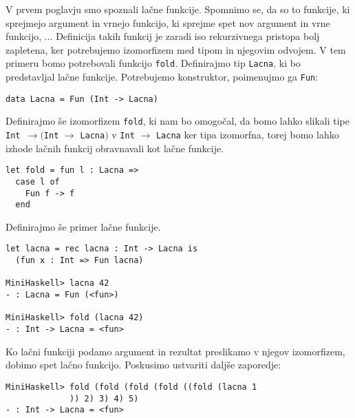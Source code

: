 \documentclass[12pt,a4paper,openany]{book}
\begin{document}
V prvem poglavju smo spoznali lačne funkcije. Spomnimo se, da so to funkcije, ki sprejmejo argument in vrnejo funkcijo, ki sprejme spet nov argument in vrne funkcijo, ... Definicija 
takih funkcij je zaradi iso rekurzivnega pristopa bolj zapletena, ker potrebujemo izomorfizem med tipom in njegovim odvojem. V tem primeru bomo potrebovali funkcijo \lstinline{fold}. 
Definirajmo tip \lstinline{Lacna}, ki bo predstavljal lačne funkcije. Potrebujemo konstruktor, poimenujmo ga \lstinline{Fun}:
\begin{lstlisting}
data Lacna = Fun (Int -> Lacna)
\end{lstlisting}
Definirajmo še izomorfizem \lstinline{fold}, ki nam bo omogočal, da bomo lahko slikali tipe \lstinline{Int }$\rightarrow ($\lstinline{Int} $\rightarrow$ \lstinline{Lacna}$)$ v \lstinline{Int} $\rightarrow$ \lstinline{Lacna} 
ker tipa izomorfna, torej bomo lahko izhode lačnih funkcij obravnavali kot lačne funkcije.
\begin{lstlisting}
let fold = fun l : Lacna =>
  case l of
    Fun f -> f
  end
\end{lstlisting}
Definirajmo še primer lačne funkcije.
\begin{lstlisting}
let lacna = rec lacna : Int -> Lacna is
  (fun x : Int => Fun lacna)

MiniHaskell> lacna 42
- : Lacna = Fun (<fun>)

MiniHaskell> fold (lacna 42)
- : Int -> Lacna = <fun>
\end{lstlisting}
Ko lačni funkciji podamo argument in rezultat preslikamo v njegov izomorfizem, dobimo spet lačno funkcijo. Poskusimo ustvariti daljše zaporedje:
\begin{lstlisting}
MiniHaskell> fold (fold (fold (fold ((fold (lacna 1
             )) 2) 3) 4) 5)
- : Int -> Lacna = <fun>
\end{lstlisting}
\end{document}
